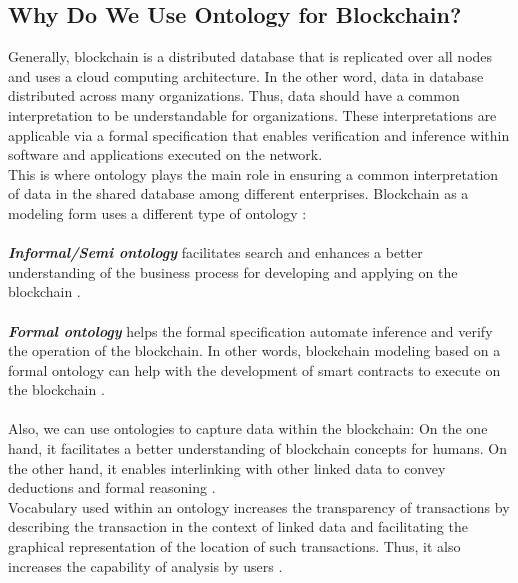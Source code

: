 \subsection{Why Do We Use Ontology for Blockchain?}
Generally, blockchain is a distributed database that is replicated over all nodes and uses a cloud computing architecture. In the other word, data in database distributed across many organizations. Thus, data should have a common interpretation to be understandable for organizations. These interpretations are applicable via a formal specification that enables verification and inference within software and applications executed on the network. \\
This is where ontology plays the main role in ensuring a common interpretation of data in the shared database among different enterprises.
Blockchain as a modeling form uses a different type of ontology \cite{Kim}: \\
\\
\textbf{\textit{Informal/Semi ontology}} facilitates search and enhances a better understanding of the business process for developing and applying on the blockchain \cite{Kim}. \\
\\
\textbf{\textit{Formal ontology}} helps the formal specification automate inference and verify the operation of the blockchain. In other words, blockchain modeling based on a formal ontology can help with the development of smart contracts to execute on the blockchain \cite{Kim}. \\
\\
Also, we can use ontologies to capture data within the blockchain: On the one hand, it facilitates a better understanding of blockchain concepts for humans. On the other hand, it enables interlinking with other linked data to convey deductions and formal reasoning \cite{Kim}.\\
Vocabulary used within an ontology increases the transparency of transactions by describing the transaction in the context of linked data and facilitating the graphical representation of the location of such transactions. Thus, it also increases the capability of analysis by users \cite{Kim}.

